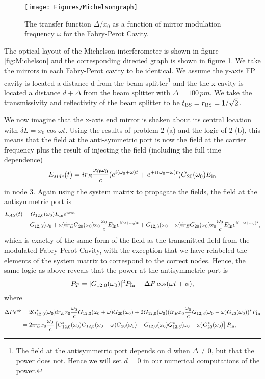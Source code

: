 \documentclass[11pt]{article}
\begin{document}
\begin{enumerate}
\begin{itemize}
\begin{figure}[t]
\texttt{[image: Figures/Michelsongraph]}
\caption{The transfer function $\Delta /x_0$ as a function of mirror modulation frequency $\omega$ for the Fabry-Perot Cavity.
}
\label{fig:Michelsongraph}
\end{figure}

The optical layout of the Michelson interferometer is shown in figure \ref{fig:Michelson} and the corresponding directed graph is shown in figure \ref{fig:Michelsongraph}. We take the mirrors in each Fabry-Perot cavity to be identical. We assume the y-axis FP cavity is located a distance d from the beam splitter\footnote{The field at the antisymmetric port depends on d when $\Delta \neq 0$, but that the power does not. Hence we will set $d=0$ in our numerical computations of the power.} and the the x-cavity is located a distance $d+\Delta$ from the beam splitter with $\Delta =100\,pm$. We take the transmissivity and reflectivity of the beam splitter to be $t_{\rm BS}=r_{\rm BS}=1/\sqrt{2}$.


We now imagine that the x-axis end mirror is shaken about its central location with $\delta L= x_0\cos\omega t$. Using the results of problem 2 (a) and the logic of 2 (b), this means that the field at the anti-symmetric port is now the field at the carrier frequency plus the result of injecting the field (including the full time dependence)
\begin{align}
E_{side}(t)=ir_E\frac{x_0\omega_0}{c}(e^{i(\omega_0 +\omega)t}+e^{+i(\omega_0-\omega )t})G_{20}(\omega_0)E_{\rm in}
\end{align}
in node 3. Again using the system matrix to propagate the fields, the field at the antisymmetric port is
\begin{align}
E_{AS}(t)&=G_{12,0}(\omega_0)E_{\rm In}e^{i\omega_0 t} \nonumber \\
&+G_{12,3}(\omega_0+\omega)ir_EG_{20}(\omega_0)x_0\frac{\omega_0}{c}E_{\rm In}e^{i(\omega+\omega_0)t}
+G_{12,3}(\omega_0-\omega)ir_EG_{20}(\omega_0)x_0\frac{\omega_0}{c}E_{\rm In}e^{i(-\omega+\omega_0)t}, \label{eq:EASmod}
\end{align}
which is exactly of the same form of the field as the transmitted field from the modulated Fabry-Perot Cavity, with the exception that we have relabeled the elements of the system matrix to correspond to the correct nodes. Hence, the same logic as above reveals that the power at the antisymmetric port is
\begin{align}
P_T=|G_{12,0}(\omega_0)|^2P_{\rm In}+\Delta P\cos(\omega t+\phi),
\end{align}
where 
\begin{align}
\Delta P e^{i\phi}&=2G^*_{12,0}(\omega_0)ir_Ex_0\frac{\omega_0}{c}G_{12,3}(\omega_0+\omega)G_{20}(\omega_0)+2G_{12,0}(\omega_0)(ir_Ex_0\frac{\omega_0}{c}G_{12,3}(\omega_0-\omega)G_{20}(\omega_0))^*P_{\rm In} \nonumber \\
&=2ir_Ex_0\frac{\omega_0}{c}\left[G^*_{12,0}(\omega_0)G_{12,3}(\omega_0+\omega)G_{20}(\omega_0)-G_{12,0}(\omega_0)G^*_{12,3}(\omega_0-\omega)G^*_{20}(\omega_0)\right]P_{\rm in},
\end{align}



\end{itemize}
\end{enumerate}
\end{document}
